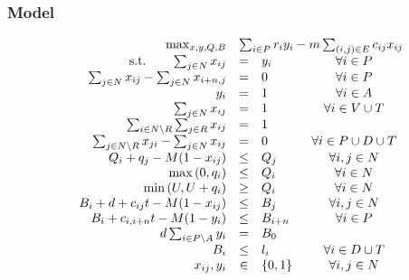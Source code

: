 \documentclass[letterpaper]{article} %
\begin{document}
\subsubsection*{Model}
\begin{equation}
\begin{array}{rrclcl}
& \max_{x, y, Q, B} & \multicolumn{3}{l}{ \sum_{i \in P} r_i y_i - m \sum_{(i,j) \in E} c_{ij} x_{ij}  } \\  
& \textrm{s.t.} \qquad  \sum_{j \in N} x_{ij}   &=& y_i & \forall i \in P \\   %
& \sum_{j \in N} x_{ij} - \sum_{j \in N} x_{i+n,j}  & = & 0 & \forall i \in P  \\     %
& y_i & =& 1 & \forall i \in A \\  %
& \sum_{j \in N} x_{ij}   &=& 1 & \forall i \in V \cup T \\  %
& \sum_{i \in N \setminus R } \sum_{j \in R }  x_{ij}   &=& 1  &\\     %
& \sum_{j \in N \setminus R } x_{ji} - \sum_{j \in N} x_{ij}  & = & 0 & \forall i \in P \cup D \cup T  \\     %
& Q_i + q_j - M (1-x_{ij} ) &\leq& Q_j & \forall i,j \in N \\  %
& \max{(0, q_i)}    &\leq& Q_i & \forall i \in N \\  %
& \min{(U, U+q_i)}    &\geq& Q_i & \forall i \in N \\  %
& B_i + d + c_{ij} t -  M (1-x_{ij} )  &\leq& B_j   & \forall i,j \in N \\  %
& B_i +  c_{i, i+n} t -  M (1- y_i )  &\leq& B_{i+n}  & \forall i \in P \\ %
&  d \sum_{i \in P \setminus A}  y_i  & = & B_0  \\ %
& B_i  &\leq& l_i  & \forall i \in D \cup T \\ %
& x_{ij}, y_i &\in& \{0, 1\} & \forall i,j \in N  \\ 
\end{array}
\end{equation}
\fi
\end{document}
